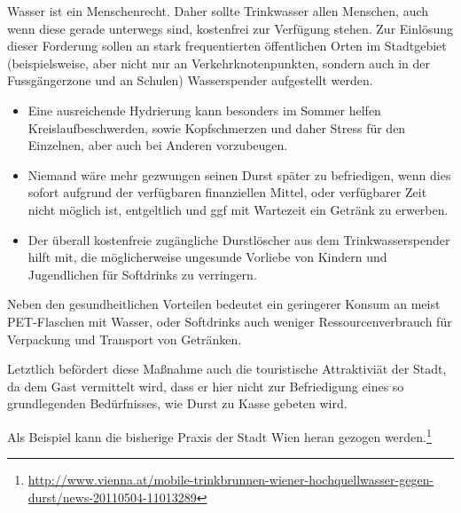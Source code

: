   Wasser ist ein Menschenrecht. Daher sollte Trinkwasser allen Menschen, auch 
  wenn diese gerade unterwegs sind, kostenfrei zur Verfügung stehen. Zur 
  Einlösung dieser Forderung sollen an stark frequentierten öffentlichen Orten 
  im Stadtgebiet (beispielsweise, aber nicht nur an Verkehrknotenpunkten, sondern auch in 
  der Fussgängerzone und an Schulen) Wasserspender aufgestellt werden.
    
  \begin{itemize}
    \item Eine ausreichende Hydrierung kann besonders im Sommer helfen 
          Kreislaufbeschwerden, sowie Kopfschmerzen und daher Stress für den 
          Einzelnen, aber auch bei Anderen vorzubeugen.
    \item Niemand wäre mehr gezwungen seinen Durst später zu befriedigen, wenn
          dies sofort aufgrund der verfügbaren finanziellen Mittel, oder 
          verfügbarer Zeit nicht möglich ist, entgeltlich und ggf mit Wartezeit 
          ein Getränk zu erwerben.
    \item Der überall kostenfreie zugängliche Durstlöscher aus dem 
          Trinkwasserspender hilft mit, die möglicherweise ungesunde Vorliebe 
          von Kindern und Jugendlichen für Softdrinks zu verringern. 
  \end{itemize}
  
  Neben den gesundheitlichen Vorteilen bedeutet ein geringerer Konsum an meist 
  PET-Flaschen mit Wasser, oder Softdrinks auch weniger Ressourcenverbrauch für 
  Verpackung und Transport von Getränken.
  
  Letztlich befördert diese Maßnahme auch die touristische Attraktiviät der 
  Stadt, da dem Gast vermittelt wird, dass er hier nicht zur Befriedigung 
  eines so grundlegenden Bedürfnisses, wie Durst zu Kasse gebeten wird.
  
  Als Beispiel kann die bisherige Praxis der Stadt Wien heran gezogen 
  werden.\footnote{\url{http://www.vienna.at/mobile-trinkbrunnen-wiener-hochquellwasser-gegen-durst/news-20110504-11013289}}
   
